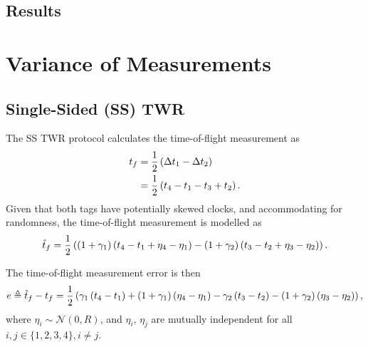 \documentclass{decar-wsd}    %
\begin{document}
\subsection{Results}



\section{Variance of Measurements}

\subsection{Single-Sided (SS) TWR}

The SS TWR protocol calculates the time-of-flight measurement as
\begin{align}
    t_f &= \frac{1}{2}\left( \Delta t_1 - \Delta t_2 \right) \\
    &= \frac{1}{2} \left( t_4 - t_1 - t_3 + t_2 \right).
\end{align}
Given that both tags have potentially skewed clocks, and accommodating for randomness, the time-of-flight measurement is modelled as
\begin{align}
    \hat{t}_f = \frac{1}{2} \left( \left( 1 + \gamma_1\right) \left( t_4 - t_1 + \eta_4 - \eta_1 \right) - \left( 1 + \gamma_2\right) \left( t_3 - t_2 + \eta_3 - \eta_2 \right) \right).
\end{align}

The time-of-flight measurement error is then
\begin{equation}
    e \triangleq \hat{t}_f - t_f = \frac{1}{2} \left( \gamma_1 \left( t_4 - t_1 \right) + \left( 1 + \gamma_1\right) \left( \eta_4 - \eta_1 \right) - \gamma_2 \left( t_3 - t_2 \right) - \left( 1 + \gamma_2\right) \left( \eta_3 - \eta_2 \right) \right),
\end{equation}
where $\eta_i \sim \mathcal{N} \left(0, R\right)$, and $\eta_i$, $\eta_j$ are mutually independent for all $i,j \in \{1,2,3,4\}, i \neq j$.
\end{document}
